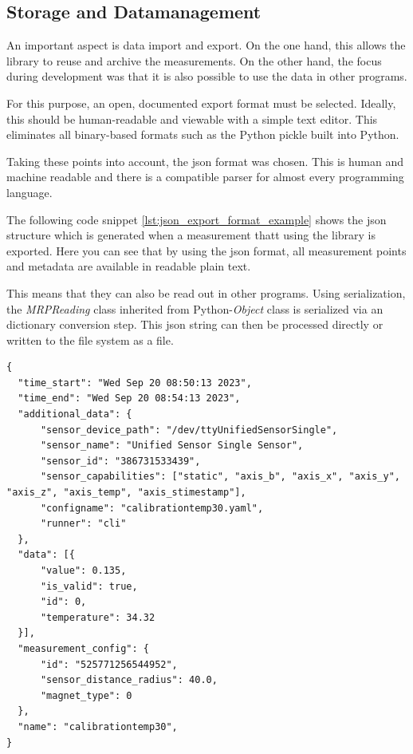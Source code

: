 \hypertarget{storage-and-datamanagement}{%
\subsection{Storage and
Datamanagement}\label{storage-and-datamanagement}}

An important aspect is data import and export. On the one hand, this
allows the library to reuse and archive the measurements. On the other
hand, the focus during development was that it is also possible to use
the data in other programs.

For this purpose, an open, documented export format must be selected.
Ideally, this should be human-readable and viewable with a simple text
editor. This eliminates all binary-based formats such as the Python
pickle built into Python.

Taking these points into account, the \gls{json} format was chosen. This
is human and machine readable and there is a compatible parser for
almost every programming language.

The following code snippet \ref{lst:json_export_format_example} shows
the \gls{json} structure which is generated when a measurement thatt
using the library is exported. Here you can see that by using the
\gls{json} format, all measurement points and metadata are available in
readable plain text.

This means that they can also be read out in other programs. Using
serialization, the \emph{MRPReading} class inherited from
Python-\emph{Object} class is serialized via an dictionary conversion
step. This \gls{json} string can then be processed directly or written
to the file system as a file.

\begin{lstlisting}[caption={JSON export structure of an MRPReading based measurement}, label=lst:json_export_format_example]
{
  "time_start": "Wed Sep 20 08:50:13 2023",
  "time_end": "Wed Sep 20 08:54:13 2023",
  "additional_data": {
      "sensor_device_path": "/dev/ttyUnifiedSensorSingle",
      "sensor_name": "Unified Sensor Single Sensor",
      "sensor_id": "386731533439",
      "sensor_capabilities": ["static", "axis_b", "axis_x", "axis_y", "axis_z", "axis_temp", "axis_stimestamp"],
      "configname": "calibrationtemp30.yaml",
      "runner": "cli"
  },
  "data": [{
      "value": 0.135,
      "is_valid": true,
      "id": 0,
      "temperature": 34.32
  }],
  "measurement_config": {
      "id": "525771256544952",
      "sensor_distance_radius": 40.0,
      "magnet_type": 0
  },
  "name": "calibrationtemp30",
}
\end{lstlisting}

